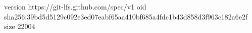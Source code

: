 version https://git-lfs.github.com/spec/v1
oid sha256:39bd5d5129c092e3ed07eabf65aa410bf685a4fdc1b43d858d3f963c182a6e2f
size 22004
